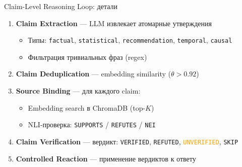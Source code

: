 \documentclass[aspectratio=169, 12pt]{beamer}
\begin{document}
\begin{frame}{Claim-Level Reasoning Loop: детали}
  \small
  \begin{enumerate}\setlength\itemsep{4pt}
    \item \textbf{Claim Extraction} --- LLM извлекает атомарные утверждения
      \begin{itemize}\setlength\itemsep{1pt}
        \item Типы: \texttt{factual}, \texttt{statistical}, \texttt{recommendation}, \texttt{temporal}, \texttt{causal}
        \item Фильтрация тривиальных фраз (regex)
      \end{itemize}

    \item \textbf{Claim Deduplication} --- embedding similarity ($\theta > 0.92$)

    \item \textbf{Source Binding} --- для каждого claim:
      \begin{itemize}\setlength\itemsep{1pt}
        \item Embedding search в ChromaDB (top-$K$)
        \item NLI-проверка: \texttt{SUPPORTS} / \texttt{REFUTES} / \texttt{NEI}
      \end{itemize}

    \item \textbf{Claim Verification} --- вердикт:
          \textcolor{okgreen}{\texttt{VERIFIED}},
          \textcolor{warnred}{\texttt{REFUTED}},
          \textcolor{orange}{\texttt{UNVERIFIED}},
          \texttt{SKIP}

    \item \textbf{Controlled Reaction} --- применение вердиктов к ответу
  \end{enumerate}
\end{frame}
\end{document}
